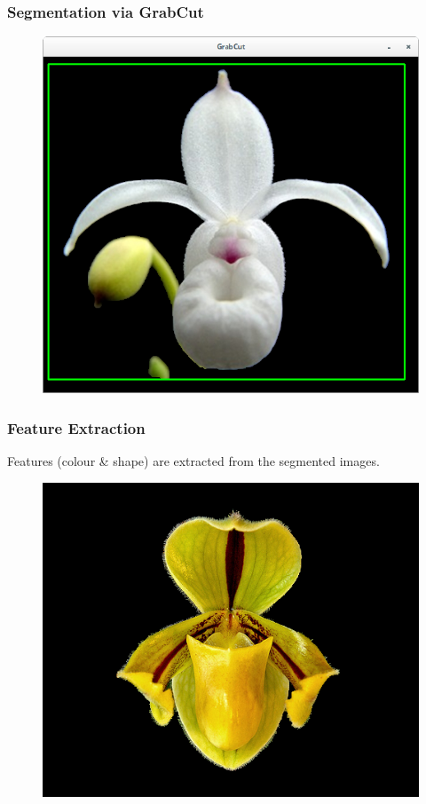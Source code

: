 \documentclass[]{beamer}
\begin{document}
    \begin{frame}[plain]
        \frametitle{Segmentation via GrabCut}

        \begin{figure}[h]
        \centering
        \includegraphics[width=.60\textwidth]{GrabCut_xerophyticum_3}
        \end{figure}
    \end{frame}

    \begin{frame}
        \frametitle{Feature Extraction}

        Features (colour \& shape) are extracted from the segmented images.

        \vspace{10 mm}

        \begin{figure}[!htb]
              \includegraphics[width=\linewidth]{grabcut_output}
            \endminipage\hfill
        \end{figure}
    \end{frame}
\end{document}
